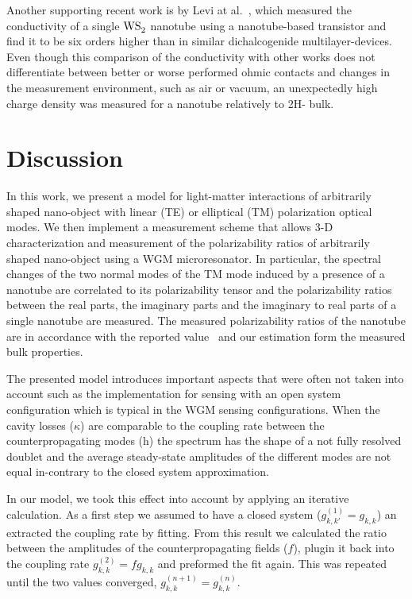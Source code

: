 \documentclass[journal=jacsat,manuscript=article]{achemso}
\begin{document}
Another supporting recent work is by Levi at al.~\cite{levi2013}, which measured the conductivity of a single $\ce{WS_2}$ nanotube using a nanotube-based transistor and find it to be six orders higher than in similar dichalcogenide multilayer-devices. Even though this comparison of the conductivity with other works does not differentiate between better or worse performed ohmic contacts and changes in the measurement environment, such as air or vacuum, an unexpectedly high charge density was measured for a  nanotube relatively to 2H- bulk.

\section{Discussion}

In this work, we present a model for light-matter interactions of arbitrarily shaped nano-object with linear (TE) or elliptical (TM) polarization optical modes. We then implement a measurement scheme that allows 3-D characterization and measurement of the polarizability ratios of arbitrarily shaped nano-object using a WGM microresonator. In particular, the spectral changes of the two normal modes of the TM mode induced by a presence of a  nanotube are correlated to its polarizability tensor and the polarizability ratios between the real parts, the imaginary parts and the imaginary to real parts of a single   nanotube are measured. The measured polarizability ratios of the  nanotube are in accordance with the reported value~\cite{tenne2005orientation} and our estimation form the measured bulk properties.

The presented model introduces important aspects that were often not taken into account such as the implementation for sensing with an open system configuration which is typical in the WGM sensing configurations. When the cavity losses ($\kappa$) are comparable to the coupling rate between the counterpropagating modes ($\textit{h}$) the spectrum has the shape of a not fully resolved doublet and the average steady-state amplitudes of the different modes are not equal in-contrary to the closed system approximation.

In our model, we took this effect into account by applying an iterative calculation. As a first step we assumed to have a closed system ($g_{k,k'}^{(1)} = g_{k,k}$) an extracted the coupling rate by fitting. From this result we calculated the ratio between the amplitudes of the counterpropagating fields ($f$), plugin it back into the coupling rate $g_{k,k}^{(2)} = fg_{k,k}$ and preformed the fit again. This was repeated until the two values converged, $g_{k,k}^{(n+1)} = g_{k,k}^{(n)}$.
\end{document}
